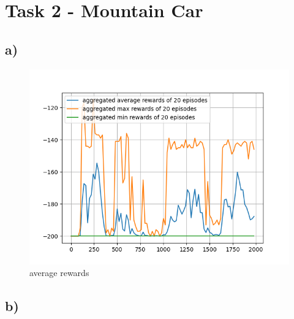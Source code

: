 \documentclass[a4paper]{article}
\begin{document}
\section*{Task 2 - Mountain Car}

\subsection*{a)}

\begin{figure}[!ht]
	\centering
	\includegraphics[width=0.7\linewidth]{reward}
	\caption{average rewards}
	\label{fig:reward}
\end{figure}


\subsection*{b)}
\end{document}

